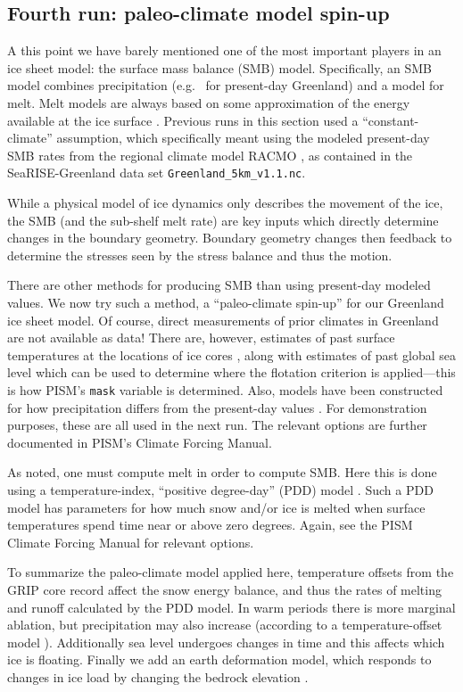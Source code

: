 \subsection{Fourth run: paleo-climate model spin-up}  \label{subsect:paleorun}  

A this point we have barely mentioned one of the most important players in an ice sheet model: the surface mass balance (SMB) model.  Specifically, an SMB model combines precipitation (e.g.~\cite{Balesetal2001} for present-day Greenland) and a model for melt.  Melt models are always based on some approximation of the energy available at the ice surface \cite{Hock05}.  Previous runs in this section used a ``constant-climate'' assumption, which specifically meant using the modeled present-day SMB rates from the regional climate model RACMO \cite{Ettemaetal2009}, as contained in the SeaRISE-Greenland data set \verb|Greenland_5km_v1.1.nc|.

While a physical model of ice dynamics only describes the movement of the ice, the SMB (and the sub-shelf melt rate) are key inputs which directly determine changes in the boundary geometry.  Boundary geometry changes then feedback to determine the stresses seen by the stress balance and thus the motion.

There are other methods for producing SMB than using present-day modeled values.  We now try such a method, a ``paleo-climate spin-up'' for our Greenland ice sheet model.  Of course, direct measurements of prior climates in Greenland are not available as data!  There are, however, estimates of past surface temperatures at the locations of ice cores \cite[for GRIP]{JohnsenetalGRIP}, along with estimates of past global sea level \cite{Imbrieetal1984} which can be used to determine where the flotation criterion is applied---this is how PISM's \verb|mask| variable is determined.  Also, models have been constructed for how precipitation differs from the present-day values \cite{Huybrechts02}.  For demonstration purposes, these are all used in the next run.  The relevant options are further documented in PISM's Climate Forcing Manual.

As noted, one must compute melt in order to compute SMB.  Here this is done using a temperature-index, ``positive degree-day'' (PDD) model \cite{Hock05}.  Such a PDD model has parameters for how much snow and/or ice is melted when surface temperatures spend time near or above zero degrees.  Again, see the PISM Climate Forcing Manual for relevant options.

To summarize the paleo-climate model applied here, temperature offsets from the GRIP core record affect the snow energy balance, and thus the rates of melting and runoff calculated by the PDD model.  In warm periods there is more marginal ablation, but precipitation may also increase (according to a temperature-offset model \cite{Huybrechts02}).  Additionally sea level undergoes changes in time and this affects which ice is floating.  Finally we add an earth deformation model, which responds to changes in ice load by changing the bedrock elevation \cite{BLKfastearth}.


